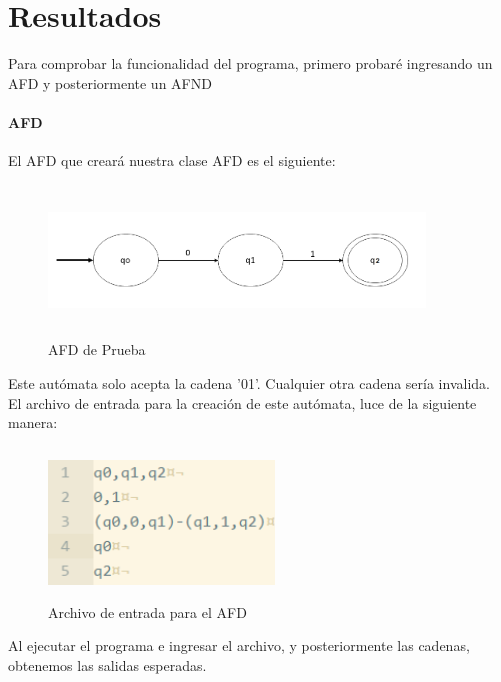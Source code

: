 \section{Resultados}
	Para comprobar la funcionalidad del programa, primero probaré ingresando un AFD y posteriormente un AFND
	\paragraph{AFD}
	El AFD que creará nuestra clase AFD es el siguiente:
	\begin{figure}[H]
		\begin{center}
			\includegraphics[width=10cm, height=4cm]{img/afd_auto.png}
			\caption{AFD de Prueba}
			\label{fig:tablas8}
		\end{center}
	\end{figure}
	Este autómata solo acepta la cadena '01'. Cualquier otra cadena sería invalida.\\
	El archivo de entrada para la creación de este autómata, luce de la siguiente manera:
	\begin{figure}[H]
		\begin{center}
			\includegraphics[width=6cm, height=4cm]{img/afd_entrada.png}
			\caption{Archivo de entrada para el AFD}
			\label{fig:tablas9}
		\end{center}
	\end{figure}
	Al ejecutar el programa e ingresar el archivo, y posteriormente las cadenas, obtenemos las salidas esperadas.
